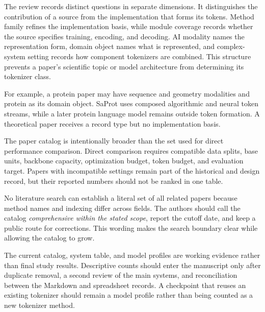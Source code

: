 The review records distinct questions in separate dimensions. It distinguishes the contribution of a source from the implementation that forms its tokens. Method family refines the implementation basis, while module coverage records whether the source specifies training, encoding, and decoding. AI modality names the representation form, domain object names what is represented, and complex-system setting records how component tokenizers are combined. This structure prevents a paper's scientific topic or model architecture from determining its tokenizer class.

For example, a protein paper may have sequence and geometry modalities and protein as its domain object. SaProt uses composed algorithmic and neural token streams, while a later protein language model remains outside token formation. A theoretical paper receives a record type but no implementation basis.

The paper catalog is intentionally broader than the set used for direct performance comparison. Direct comparison requires compatible data splits, base units, backbone capacity, optimization budget, token budget, and evaluation target. Papers with incompatible settings remain part of the historical and design record, but their reported numbers should not be ranked in one table.

No literature search can establish a literal set of all related papers because method names and indexing differ across fields. The authors should call the catalog \emph{comprehensive within the stated scope}, report the cutoff date, and keep a public route for corrections. This wording makes the search boundary clear while allowing the catalog to grow.

The current catalog, system table, and model profiles are working evidence rather than final study results. Descriptive counts should enter the manuscript only after duplicate removal, a second review of the main systems, and reconciliation between the Markdown and spreadsheet records. A checkpoint that reuses an existing tokenizer should remain a model profile rather than being counted as a new tokenizer method.

